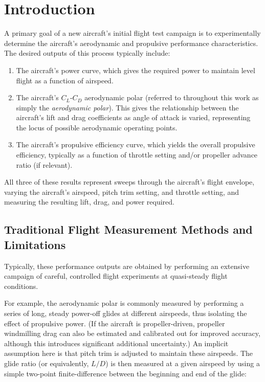 \documentclass[conf]{new-aiaa}
\begin{document}
    \section{Introduction}

    A primary goal of a new aircraft's initial flight test campaign is to experimentally determine the aircraft's aerodynamic and propulsive performance characteristics. The desired outputs of this process typically include:

    \begin{enumerate}
        \item The aircraft's power curve, which gives the required power to maintain level flight as a function of airspeed.
        \item The aircraft's $C_L$-$C_D$ aerodynamic polar (referred to throughout this work as simply the \textit{aerodynamic polar}). This gives the relationship between the aircraft's lift and drag coefficients as angle of attack is varied, representing the locus of possible aerodynamic operating points.
        \item The aircraft's propulsive efficiency curve, which yields the overall propulsive efficiency, typically as a function of throttle setting and/or propeller advance ratio (if relevant).
    \end{enumerate}

    All three of these results represent sweeps through the aircraft's flight envelope, varying the aircraft's airspeed, pitch trim setting, and throttle setting, and measuring the resulting lift, drag, and power required.

    \subsection{Traditional Flight Measurement Methods and Limitations}

    Typically, these performance outputs are obtained by performing an extensive campaign of careful, controlled flight experiments at quasi-steady flight conditions.

    For example, the aerodynamic polar is commonly measured by performing a series of long, steady power-off glides at different airspeeds, thus isolating the effect of propulsive power. (If the aircraft is propeller-driven, propeller windmilling drag can also be estimated and calibrated out for improved accuracy, although this introduces significant additional uncertainty.) An implicit assumption here is that pitch trim is adjusted to maintain these airspeeds. The glide ratio (or equivalently, $L/D$) is then measured at a given airspeed by using a simple two-point finite-difference between the beginning and end of the glide:
\end{document}
